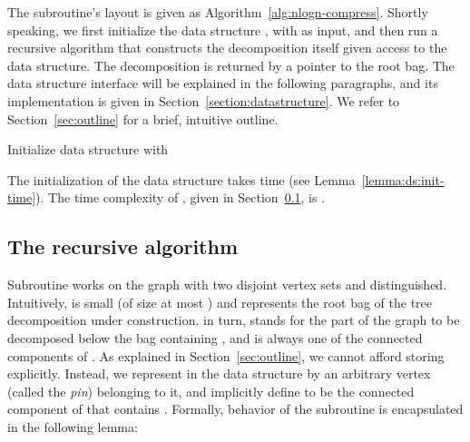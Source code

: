 \documentclass[a4paper,11pt]{article}
\theoremstyle{definition}
\theoremstyle{remark}
\begin{document}
The subroutine's layout is given as
Algorithm~\ref{alg:nlogn-compress}.  Shortly speaking, we first
initialize the data structure , with  as input,
and then run a recursive algorithm  that constructs the
decomposition itself given access to the data structure.  The
decomposition is returned by a pointer to the root bag.  The data
structure interface will be explained in the following paragraphs, and
its implementation is given in Section~\ref{section:datastructure}.
We refer to Section~\ref{sec:outline} for a brief, intuitive outline.

\begin{algorithm}

  
    \Indp
  \BlankLine
  Initialize data structure  with \\
  
  \KwRet{}
  
  \caption{.}
  
  \label{alg:nlogn-compress}
\end{algorithm}

The initialization of the data structure takes  time (see
Lemma~\ref{lemma:ds:init-time}).  The time complexity of ,
given in Section~\ref{section:findTDlogn}, is .








\subsection{The recursive algorithm
  }\label{section:findTDlogn}

Subroutine  works on the graph  with two disjoint vertex
sets  and  distinguished.  Intuitively,  is small (of size at
most ) and represents the root bag of the tree decomposition
under construction.   in turn, stands for the part of the graph to
be decomposed below the bag containing , and is always one of the
connected components of .  As explained in
Section~\ref{sec:outline}, we cannot afford storing  explicitly.
Instead, we represent  in the data structure by an arbitrary vertex
 (called the {\emph{pin}}) belonging to it, and implicitly
define  to be the connected component of  that
contains .  Formally, behavior of the subroutine  is
encapsulated in the following lemma:
\end{document}
